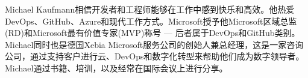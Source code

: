 Michael Kaufmann相信开发者和工程师能够在工作中感到快乐和高效。他热爱DevOps、GitHub、Azure和现代工作方式。Microsoft授予他Microsoft区域总监(RD)和Microsoft最有价值专家(MVP)称号 --- 后者属于DevOps和GitHub类别。Michael同时也是德国Xebia Microsoft服务公司的创始人兼总经理，这是一家咨询公司，通过支持客户进行云、DevOps和数字化转型来帮助他们成为数字领导者。Michael通过书籍、培训，以及经常在国际会议上进行分享。